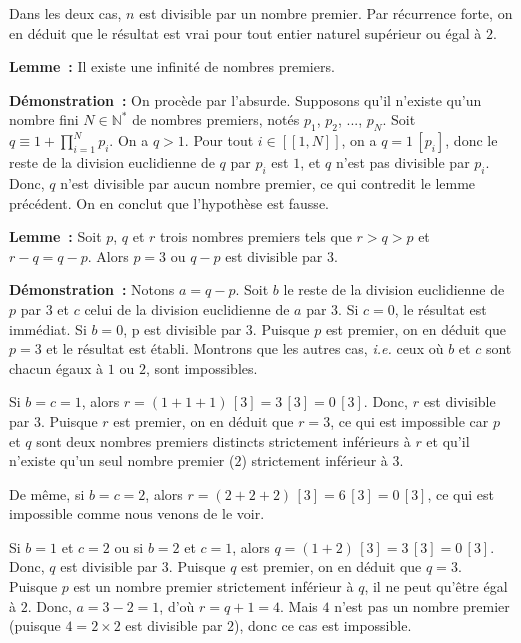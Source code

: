 Dans les deux cas, $n$ est divisible par un nombre premier. 
Par récurrence forte, on en déduit que le résultat est vrai pour tout entier naturel supérieur ou égal à $2$.

\done

\bigskip

\noindent\textbf{Lemme :} Il existe une infinité de nombres premiers.

\medskip

\noindent\textbf{Démonstration :} On procède par l'absurde. 
Supposons qu'il n'existe qu'un nombre fini $N \in \mathbb{N}^*$ de nombres premiers, notés $p_1$, $p_2$, ..., $p_N$. 
Soit $q \equiv 1 + \prod_{i=1}^N p_i$. 
On a $q > 1$.
Pour tout $i \in [\![1, N]\!]$, on a $q = 1 \, [p_i]$, donc le reste de la division euclidienne de $q$ par $p_i$ est $1$, et $q$ n'est pas divisible par $p_i$.  
Donc, $q$ n'est divisible par aucun nombre premier, ce qui contredit le lemme précédent. 
On en conclut que l'hypothèse est fausse. 

\done

\bigskip

\noindent\textbf{Lemme :} Soit $p$, $q$ et $r$ trois nombres premiers tels que $r > q > p$ et $r-q = q-p$. Alors $p=3$ ou $q-p$ est divisible par $3$.

\medskip

\noindent\textbf{Démonstration :} Notons $a = q-p$. 
Soit $b$ le reste de la division euclidienne de $p$ par $3$ et $c$ celui de la division euclidienne de $a$ par $3$. 
Si $c = 0$, le résultat est immédiat.
Si $b = 0$, p est divisible par $3$. 
Puisque $p$ est premier, on en déduit que $p=3$ et le résultat est établi. 
Montrons que les autres cas, \textit{i.e.} ceux où $b$ et $c$ sont chacun égaux à $1$ ou $2$, sont impossibles. 

Si $b = c = 1$, alors $r = (1 + 1 + 1) \, [3] = 3 \, [3] = 0 \, [3]$. 
Donc, $r$ est divisible par $3$. 
Puisque $r$ est premier, on en déduit que $r=3$, ce qui est impossible car $p$ et $q$ sont deux nombres premiers distincts strictement inférieurs à $r$ et qu'il n'existe qu'un seul nombre premier ($2$) strictement inférieur à $3$. 

De même, si $b = c = 2$, alors $r = (2 + 2 + 2) \, [3] = 6 \, [3] = 0 \, [3]$, ce qui est impossible comme nous venons de le voir.

Si $b = 1$ et $c = 2$ ou si $b = 2$ et $c = 1$, alors $q = (1 + 2) \, [3] = 3 \, [3] = 0 \, [3]$. 
Donc, $q$ est divisible par $3$.
Puisque $q$ est premier, on en déduit que $q=3$. 
Puisque $p$ est un nombre premier strictement inférieur à $q$, il ne peut qu'être égal à $2$. 
Donc, $a = 3-2 = 1$, d'où $r = q + 1 = 4$. 
Mais $4$ n'est pas un nombre premier (puisque $4 = 2 \times 2$ est divisible par $2$), donc ce cas est impossible.

